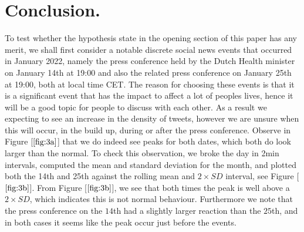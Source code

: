 \documentclass[10pt]{article}
\begin{document}
\section{Conclusion.}

To test whether the hypothesis state in the opening section of this paper has any merit, we
shall first consider a notable discrete social news events that occurred in January 2022,
namely the press conference held by the Dutch Health minister on January 14th at 19:00 and
also the related press conference on January 25th at 19:00, both at local time CET. The reason
for choosing these events is that it is a significant event that has the
impact to affect a lot of peoples lives, hence it will be a good topic for people to
discuss with each other. As a result we expecting to see an increase in the density of tweets,
however we are unsure when this will occur, in the build up, during or after the press
conference. Observe in Figure [$\ref{fig:3a}$] that we do indeed see peaks for both dates,
which both do look larger than the normal. To check this observation, we broke the day in
2min intervals, computed the mean and standard deviation for the month, and plotted both
the 14th and 25th against the rolling mean and $2\times SD$ interval, see Figure
[$\ref{fig:3b}$]. From Figure [$\ref{fig:3b}$], we see that both times the peak is well
above a $2\times SD$, which indicates this is not normal behaviour. Furthermore we note
that the press conference on the $14$th had a slightly larger reaction than the $25$th,
and in both cases it seems like the peak occur just before the events.  
\end{document}

